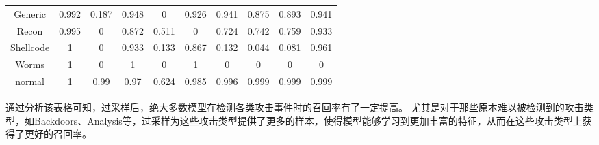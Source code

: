 \begin{table}[htbp]
\begin{tabular}{cccccccccc}
		Generic   & 0.992 & 0.187 & 0.948 & 0     & 0.926 & 0.941 & 0.875 & 0.893  & 0.941 \\
		Recon     & 0.995 & 0     & 0.872 & 0.511 & 0     & 0.724 & 0.742 & 0.759  & 0.933 \\
		Shellcode & 1     & 0     & 0.933 & 0.133 & 0.867 & 0.132 & 0.044 & 0.081  & 0.961 \\
		Worms     & 1     & 0     & 1     & 0     & 1     & 0     & 0     & 0      & 0     \\
		normal    & 1     & 0.99  & 0.97  & 0.624 & 0.985 & 0.996 & 0.999 & 0.999  & 0.999 \\
		\bottomrule
	\end{tabular}
\end{table}
通过分析该表格可知，过采样后，绝大多数模型在检测各类攻击事件时的召回率有了一定提高。
尤其是对于那些原本难以被检测到的攻击类型，如Backdoors、Analysis等，过采样为这些攻击类型提供了更多的样本，使得模型能够学习到更加丰富的特征，从而在这些攻击类型上获得了更好的召回率。\par

